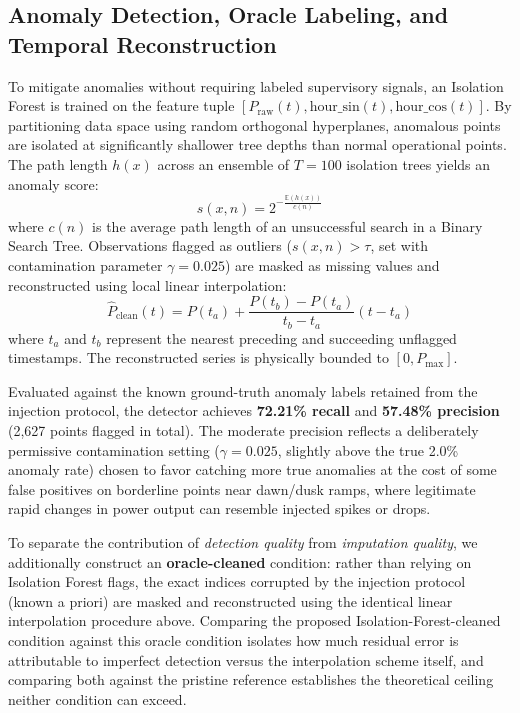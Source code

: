 \documentclass[conference]{IEEEtran}
\begin{document}
\subsection{Anomaly Detection, Oracle Labeling, and Temporal Reconstruction}
To mitigate anomalies without requiring labeled supervisory signals, an Isolation Forest is trained on the feature tuple $[P_{\text{raw}}(t), \text{hour\_sin}(t), \text{hour\_cos}(t)]$. By partitioning data space using random orthogonal hyperplanes, anomalous points are isolated at significantly shallower tree depths than normal operational points. The path length $h(x)$ across an ensemble of $T=100$ isolation trees yields an anomaly score:
\begin{equation}
s(x, n) = 2^{-\frac{\mathbb{E}(h(x))}{c(n)}}
\end{equation}
where $c(n)$ is the average path length of an unsuccessful search in a Binary Search Tree. Observations flagged as outliers ($s(x,n) > \tau$, set with contamination parameter $\gamma = 0.025$) are masked as missing values and reconstructed using local linear interpolation:
\begin{equation}
\hat{P}_{\text{clean}}(t) = P(t_a) + \frac{P(t_b) - P(t_a)}{t_b - t_a}(t - t_a)
\end{equation}
where $t_a$ and $t_b$ represent the nearest preceding and succeeding unflagged timestamps. The reconstructed series is physically bounded to $[0, P_{\text{max}}]$.

Evaluated against the known ground-truth anomaly labels retained from the injection protocol, the detector achieves \textbf{72.21\% recall} and \textbf{57.48\% precision} (2{,}627 points flagged in total). The moderate precision reflects a deliberately permissive contamination setting ($\gamma=0.025$, slightly above the true 2.0\% anomaly rate) chosen to favor catching more true anomalies at the cost of some false positives on borderline points near dawn/dusk ramps, where legitimate rapid changes in power output can resemble injected spikes or drops.

To separate the contribution of \emph{detection quality} from \emph{imputation quality}, we additionally construct an \textbf{oracle-cleaned} condition: rather than relying on Isolation Forest flags, the exact indices corrupted by the injection protocol (known a priori) are masked and reconstructed using the identical linear interpolation procedure above. Comparing the proposed Isolation-Forest-cleaned condition against this oracle condition isolates how much residual error is attributable to imperfect detection versus the interpolation scheme itself, and comparing both against the pristine reference establishes the theoretical ceiling neither condition can exceed.
\end{document}
